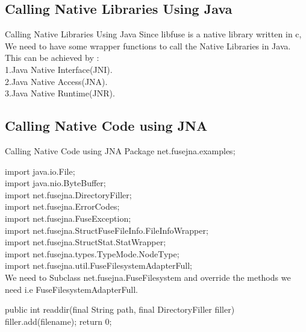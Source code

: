 \documentclass{beamer}
\begin{document}
\subsection{Calling Native Libraries Using Java}
\begin{frame}{Calling Native Libraries Using Java}
Since libfuse is a native library written in c, We need to have some wrapper functions to call the Native Libraries in Java.\\
\bigskip
This can be achieved by :\\
\bigskip
1.Java Native Interface(JNI).\\
\bigskip
2.Java Native Access(JNA).\\
\bigskip
3.Java Native Runtime(JNR).\\

\end{frame}
\subsection{Calling Native Code using JNA}
\begin{frame}{Calling Native Code using JNA}
Package net.fusejna.examples;

import java.io.File;\\
import java.nio.ByteBuffer;\\
import net.fusejna.DirectoryFiller;\\
import net.fusejna.ErrorCodes;\\
import net.fusejna.FuseException;\\
import net.fusejna.StructFuseFileInfo.FileInfoWrapper;\\
import net.fusejna.StructStat.StatWrapper;\\
import net.fusejna.types.TypeMode.NodeType;\\
import net.fusejna.util.FuseFilesystemAdapterFull;\\
\bigskip
We need to Subclass net.fusejna.FuseFilesystem and override the methods we need i.e FuseFilesystemAdapterFull.\\
\bigskip

public int readdir(final String path, final DirectoryFiller filler)\\
	{
		filler.add(filename);
		return 0;
	}
\end{frame}
\end{document}
